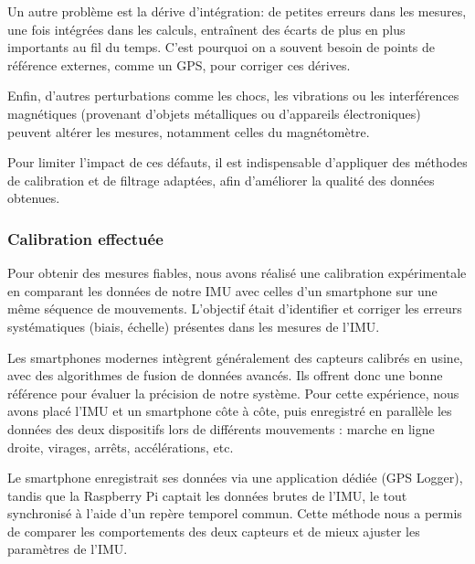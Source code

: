 \vspace{1em}

Un autre problème est la dérive d’intégration: de petites erreurs dans les mesures, une fois intégrées dans les calculs, entraînent des écarts de plus en plus importants au fil du temps. C’est pourquoi on a souvent besoin de points de référence externes, comme un GPS, pour corriger ces dérives.

\vspace{1em}

Enfin, d'autres perturbations comme les chocs, les vibrations ou les interférences magnétiques (provenant d’objets métalliques ou d’appareils électroniques) peuvent altérer les mesures, notamment celles du magnétomètre.

\vspace{1em}

Pour limiter l’impact de ces défauts, il est indispensable d’appliquer des méthodes de calibration et de filtrage adaptées, afin d’améliorer la qualité des données obtenues.

\vspace{2em}

\subsubsection{Calibration effectuée}

Pour obtenir des mesures fiables, nous avons réalisé une calibration expérimentale en comparant les données de notre IMU avec celles d’un smartphone sur une même séquence de mouvements. L’objectif était d’identifier et corriger les erreurs systématiques (biais, échelle) présentes dans les mesures de l’IMU.

\vspace{1em}

Les smartphones modernes intègrent généralement des capteurs calibrés en usine, avec des algorithmes de fusion de données avancés. Ils offrent donc une bonne référence pour évaluer la précision de notre système. Pour cette expérience, nous avons placé l’IMU et un smartphone côte à côte, puis enregistré en parallèle les données des deux dispositifs lors de différents mouvements : marche en ligne droite, virages, arrêts, accélérations, etc.

\vspace{1em}

Le smartphone enregistrait ses données via une application dédiée (GPS Logger), tandis que la Raspberry Pi captait les données brutes de l’IMU, le tout synchronisé à l’aide d’un repère temporel commun. Cette méthode nous a permis de comparer les comportements des deux capteurs et de mieux ajuster les paramètres de l’IMU.


